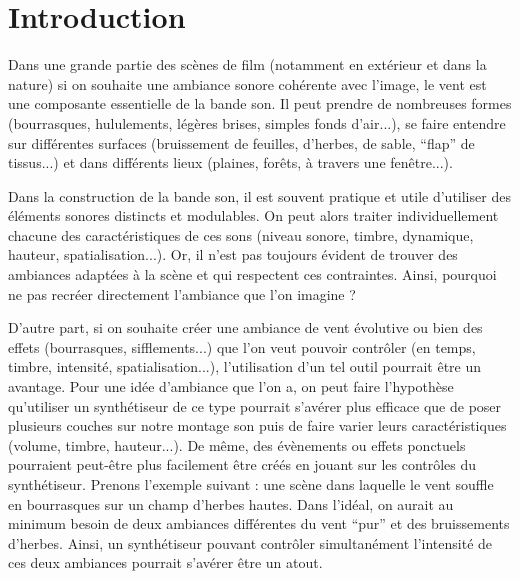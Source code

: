 ﻿\documentclass[12pt]{article}
\begin{document}
\cleardoublepage           %

\tableofcontents

\cleardoublepage 
{}     %
\setcounter{page}{1}       %

\section*{Introduction}
\leavevmode

Dans une grande partie des scènes de film (notamment en extérieur et dans la nature) si on souhaite une ambiance sonore cohérente avec l’image, le vent est une composante essentielle de la bande son. Il peut prendre de nombreuses formes (bourrasques, hululements, légères brises, simples fonds d’air...), se faire entendre sur différentes surfaces (bruissement de feuilles, d’herbes, de sable, “flap” de tissus...) et dans différents lieux (plaines, forêts, à travers une fenêtre...).

Dans la construction de la bande son, il est souvent pratique et utile d'utiliser des éléments sonores distincts et modulables. On peut alors traiter individuellement chacune des caractéristiques de ces sons (niveau sonore, timbre, dynamique, hauteur, spatialisation...). Or, il n’est pas toujours évident de trouver des ambiances adaptées à la scène et qui respectent ces contraintes. Ainsi, pourquoi ne pas recréer directement l’ambiance que l’on imagine ?

D’autre part, si on souhaite créer une ambiance de vent évolutive ou bien des effets (bourrasques, sifflements...) que l’on veut pouvoir contrôler (en temps, timbre, intensité, spatialisation...), l'utilisation d’un tel outil pourrait être un avantage. Pour une idée d’ambiance que l’on a, on peut faire l’hypothèse qu’utiliser un synthétiseur de ce type pourrait s’avérer plus efficace que de poser plusieurs couches sur notre montage son puis de faire varier leurs caractéristiques (volume, timbre, hauteur...). De même, des évènements ou effets ponctuels pourraient peut-être plus facilement être créés en jouant sur les contrôles du synthétiseur. Prenons l’exemple suivant : une scène dans laquelle le vent souffle en bourrasques sur un champ d’herbes hautes. Dans l’idéal, on aurait au minimum besoin de deux ambiances différentes du vent “pur” et des bruissements d’herbes. Ainsi, un synthétiseur pouvant contrôler simultanément l’intensité de ces deux ambiances pourrait s’avérer être un atout.
\end{document}
